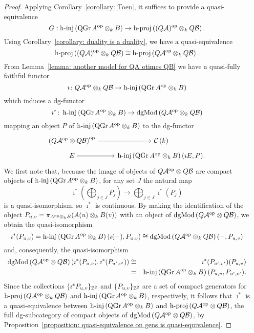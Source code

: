 \begin{proof}
  Applying Corollary~\ref{corollary: Toen}, it suffices to provide a quasi-equivalence
  \begin{displaymath}
    G : \operatorname{h-inj}\left(\operatorname{QGr}A^{\operatorname{op}} \otimes_k B\right) \to \operatorname{h-proj}\left( (Q \mathcal A)^{\operatorname{op}} \otimes_k Q \mathcal B\right).
  \end{displaymath}
  Using Corollary~\ref{corollary: duality is a duality}, we have a quasi-equivalence
  \begin{displaymath}
    \operatorname{h-proj}\left( (Q \mathcal A)^{\operatorname{op}} \otimes_k Q \mathcal B\right) \cong \operatorname{h-proj}\left( Q \mathcal A^{\operatorname{op}} \otimes_k Q \mathcal B\right). 
  \end{displaymath}
  From Lemma~\ref{lemma: another model for QA otimes QB} we have a quasi-fully faithful functor 
  \begin{displaymath}
    \imath \colon Q \mathcal A^{\operatorname{op}} \otimes_k Q \mathcal B \to \operatorname{h-inj}\left(\operatorname{QGr}A^{\operatorname{op}} \otimes_k B\right)
  \end{displaymath}
  which induces a dg-functor
  \begin{displaymath}
    \imath^\ast \colon \operatorname{h-inj}\left(\operatorname{QGr}A^{\operatorname{op}} \otimes_k B\right) \to \operatorname{dgMod}\left(Q \mathcal A^{\operatorname{op}} \otimes_k Q \mathcal B\right)
  \end{displaymath}
  mapping an object \(P\) of \(\operatorname{h-inj}\left(\operatorname{QGr}A^{\operatorname{op}} \otimes_k B\right)\) to the dg-functor
  \[\begin{tikzcd}[row sep=tiny]
  \left(Q\A^\opp \otimes Q\B\right)^\opp \arrow{r} & \CH{k}\\
  E \arrow[mapsto]{r} & \hinj{\QGr{A^\opp \otimes_k B}}(\imath E, P).
  \end{tikzcd}\]
  We first note that, because the image of objects of \(Q\mathcal{A}^{\operatorname{op}} \otimes Q\mathcal{B}\) are compact objects of \(\operatorname{h-inj}\left(\operatorname{QGr}A^{\operatorname{op}} \otimes_k B\right)\), for any set \(J\) the natural map
  \[\imath^\ast\left(\bigoplus_{j \in J} P_j\right)\to \bigoplus_{j \in J} \imath^\ast(P_j)\]
  is a quasi-isomorphism, so \(\imath^\ast\) is continuous.
  By making the identification of the object \({P_{u,v} = \pi_{A^{\operatorname{op}} \otimes_k B}(A(u) \otimes_k B(v))}\) with an object of \(\operatorname{dgMod}\left(Q\mathcal{A}^{\operatorname{op}} \otimes Q\mathcal{B}\right)\), we obtain the quasi-isomorphism
  \[\imath^\ast(P_{u,v}) = \operatorname{h-inj}\left(\operatorname{QGr}A^{\operatorname{op}} \otimes_k B\right)(\imath(-), P_{u,v}) \cong \operatorname{dgMod}\left(Q\mathcal{A}^{\operatorname{op}} \otimes_k Q\mathcal{B}\right)(-, P_{u,v})\]
  and, consequently, the quasi-isomorphism
  \begin{eqnarray*}
    \operatorname{dgMod}\left(Q\mathcal{A}^{\operatorname{op}} \otimes Q\mathcal{B}\right)(\imath^\ast(P_{u,v}), \imath^\ast(P_{u^\prime, v^\prime}))
    &\cong& \imath^\ast(P_{u^\prime, v^\prime})(P_{u,v}) \\
    &=& \operatorname{h-inj}\left(\operatorname{QGr}A^{\operatorname{op}} \otimes_k B\right)(P_{u,v}, P_{u^\prime, v^\prime}).
  \end{eqnarray*}
  Since the collections \(\{\imath^\ast P_{u,v}\}_{\mathbb{Z}^2}\) and \(\{P_{u,v}\}_{\mathbb{Z}^2}\) are a set of compact generators for \(\operatorname{h-proj}\left(Q\mathcal{A}^{\operatorname{op}} \otimes_k Q\mathcal{B}\right)\) and \(\operatorname{h-inj}\left(\operatorname{QGr}A^{\operatorname{op}} \otimes_k B\right)\), respectively, it follows that \(\imath^\ast\) is a quasi-equivalence between \(\operatorname{h-inj}\left(\operatorname{QGr}A^{\operatorname{op}} \otimes_k B\right)\) and \(\operatorname{h-proj}\left(Q\mathcal{A}^{\operatorname{op}} \otimes Q\mathcal{B}\right)\), the full dg-subcategory of compact objects of \(\operatorname{dgMod}\left(Q\mathcal{A}^{\operatorname{op}} \otimes Q\mathcal{B}\right)\), by Proposition~\ref{proposition: quasi-equivalence on gens is quasi-equivalence}.


\end{proof}
